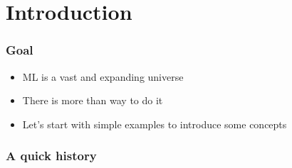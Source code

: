 \section{Introduction}

\begin{frame}
  \frametitle{Goal}
  \begin{itemize}
  \item ML is a vast and expanding universe
  \item There is more than way to do it
  \item Let's start with simple examples to introduce some concepts
  \end{itemize}
\end{frame}

\begin{frame}
  \frametitle{A quick history}

\end{frame}
